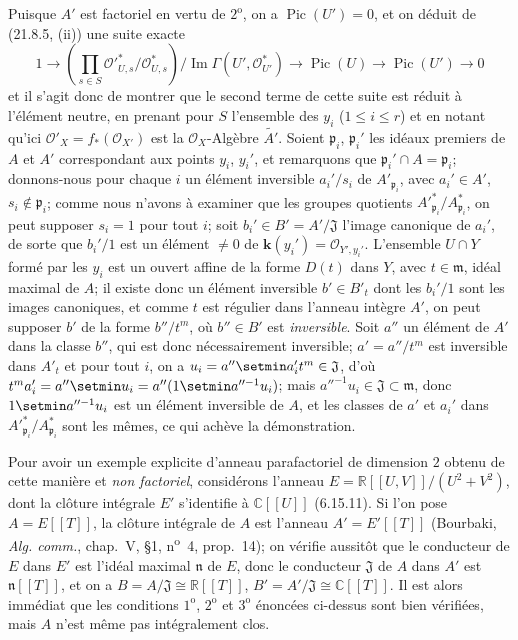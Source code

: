 \begin{examples}[21.13.9]
Puisque $A'$ est factoriel en vertu de
$2^{\mathrm o}$, on a $\operatorname{Pic}(U')=0$, et on déduit de (21.8.5, (ii)) une
suite exacte
\[
  1\longrightarrow
  \left(\prod_{s\in S}
  \mathcal O'^*_{U,s}/\mathcal O^*_{U,s}\right)
  \big/\operatorname{Im}\Gamma(U',\mathcal O_{U'}^*)
  \longrightarrow\operatorname{Pic}(U)\longrightarrow\operatorname{Pic}(U')
  \longrightarrow0
\]
et il s'agit donc de montrer que le second terme de cette suite est réduit à l'élément
neutre, en prenant pour $S$ l'ensemble des $y_i$ ($1\leq i\leq r$) et en notant
qu'ici $\mathcal O'_X=f_*(\mathcal O_{X'})$ est la $\mathcal O_X$-Algèbre $\widetilde{A'}$. Soient
$\mathfrak p_i$, $\mathfrak p_i'$ les idéaux premiers de $A$ et $A'$ correspondant
aux points $y_i$, $y_i'$, et remarquons que $\mathfrak p_i'\cap A=\mathfrak p_i$;
donnons-nous pour chaque $i$ un élément inversible $a_i'/s_i$ de
$A'_{\mathfrak p_i}$, avec $a_i'\in A'$, $s_i\notin\mathfrak p_i$; comme nous
n'avons à examiner que les groupes quotients
$A'^*_{\mathfrak p_i}/A^*_{\mathfrak p_i}$, on peut supposer $s_i=1$ pour tout
$i$; soit $b_i'\in B'=A'/\mathfrak J$ l'image canonique de $a_i'$, de sorte que
$b_i'/1$ est un élément $\neq0$ de $\boldsymbol{k}(y_i')=\mathcal O_{Y',y_i'}$. L'ensemble
$U\cap Y$ formé par les $y_i$ est un ouvert affine de la forme $D(t)$ dans $Y$, avec
$t\in\mathfrak m$, idéal maximal de $A$; il existe donc un élément inversible
$b'\in B'_t$ dont les $b_i'/1$ sont les images canoniques, et comme $t$ est régulier
dans l'anneau intègre $A'$, on peut supposer $b'$ de la forme $b''/t^m$, où
$b''\in B'$ est \emph{inversible}. Soit $a''$ un élément de $A'$ dans la classe $b''$, qui
est donc nécessairement inversible; $a'=a''/t^m$ est inversible dans $A'_t$ et pour
tout $i$, on a $u_i=a''\setmin a_i't^m\in\mathfrak J$, d'où $t^m a_i'=a''\setmin u_i=a''(1\setmin a''^{-1}u_i)$;
mais $a''^{-1}u_i\in\mathfrak J\subset\mathfrak m$, donc $1\setmin a''^{-1}u_i$ est un
élément inversible de $A$, et les classes de $a'$ et $a_i'$ dans
$A'^*_{\mathfrak p_i}/A^*_{\mathfrak p_i}$ sont les mêmes, ce qui achève la
démonstration.

Pour avoir un exemple explicite d'anneau parafactoriel de dimension $2$ obtenu de
cette manière et \emph{non factoriel}, considérons l'anneau
$E=\mathbb R[[U,V]]/(U^2+V^2)$, dont la clôture intégrale $E'$ s'identifie à $\mathbb C[[U]]$ (6.15.11). Si l'on pose
$A=E[[T]]$, la clôture intégrale de $A$ est l'anneau $A'=E'[[T]]$ (Bourbaki,
\emph{Alg. comm.}, chap.~V, \S1, n\textsuperscript{o}~4, prop.~14); on vérifie
aussitôt que le conducteur de $E$ dans $E'$ est l'idéal maximal $\mathfrak n$ de
$E$, donc le conducteur $\mathfrak J$ de $A$ dans $A'$ est $\mathfrak n[[T]]$, et on
a $B=A/\mathfrak J\cong\mathbb R[[T]]$, $B'=A'/\mathfrak J\cong\mathbb C[[T]]$.
Il est alors immédiat que les conditions $1^{\mathrm o}$, $2^{\mathrm o}$ et
$3^{\mathrm o}$ énoncées ci-dessus sont bien vérifiées, mais $A$ n'est même pas
intégralement clos.


\end{examples}
